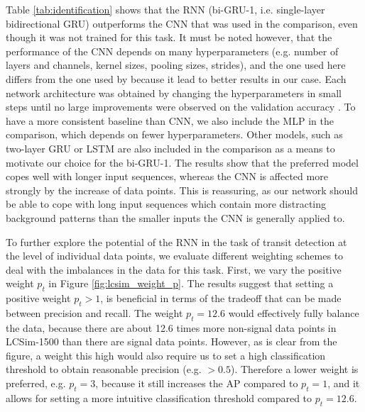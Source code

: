 Table \ref{tab:identification} shows that the RNN (bi-GRU-1, i.e. single-layer bidirectional GRU) outperforms the CNN that was used in the comparison, even though it was not trained for this task. It must be noted however, that the performance of the CNN depends on many hyperparameters (e.g. number of layers and channels, kernel sizes, pooling sizes, strides), and the one used here differs from the one used by \cite{pearson2018searching} because it lead to better results in our case. Each network architecture was obtained by changing the hyperparameters in small steps until no large improvements were observed on the validation accuracy . To have a more consistent baseline than CNN, we also include the MLP in the comparison, which depends on fewer hyperparameters. Other models, such as two-layer GRU or LSTM are also included in the comparison as a means to motivate our choice for the bi-GRU-1. The results show that the preferred model copes well with longer input sequences, whereas the CNN is affected more strongly by the increase of data points. This is reassuring, as our network should be able to cope with long input sequences which contain more distracting background patterns than the smaller inputs the CNN is generally applied to.

To further explore the potential of the RNN in the task of transit detection at the level of individual data points, we evaluate different weighting schemes to deal with the imbalances in the data for this task. First, we vary the positive weight $p_t$ in Figure \ref{fig:lcsim_weight_p}. The results suggest that setting a positive weight $p_t > 1$, is beneficial in terms of the tradeoff that can be made between precision and recall. The weight $p_t=12.6$ would effectively fully balance the data, because there are about 12.6 times more non-signal data points in LCSim-1500 than there are signal data points. However, as is clear from the figure, a weight this high would also require us to set a high classification threshold to obtain reasonable precision (e.g. $> 0.5$). Therefore a lower weight is preferred, e.g. $p_t = 3$, because it still increases the AP compared to $p_t = 1$, and it allows for setting a more intuitive classification threshold compared to $p_t = 12.6$.


